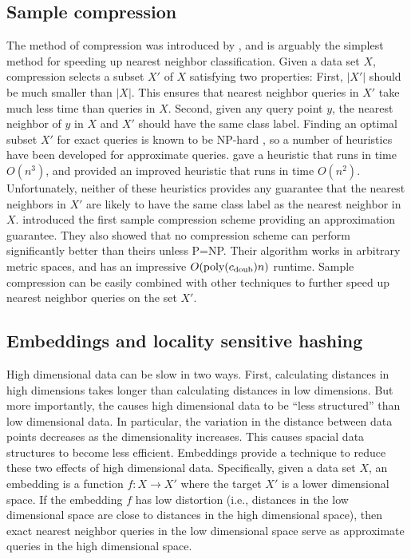 \documentclass[thesis.tex]{subfiles}
\newcommand{\cdoub}{c_\textnormal{doub}}
\newcommand{\poly}[1]{\text{poly}(#1)}
\begin{document}

\subsection{Sample compression}

The method of compression was introduced by \citet{hart1968condensed},
and is arguably the simplest method for speeding up nearest neighbor classification.
Given a data set $X$, compression selects a subset $X'$ of $X$ satisfying two properties:
First, $|X'|$ should be much smaller than $|X|$.
This ensures that nearest neighbor queries in $X'$ take much less time than queries in $X$.
Second, given any query point $y$, 
the nearest neighbor of $y$ in $X$ and $X'$ should have the same class label. 
Finding an optimal subset $X'$ for exact queries is known to be NP-hard \citep{zukhba2010np},
so a number of heuristics have been developed for approximate queries.
\citet{hart1968condensed} gave a heuristic that runs in time $O(n^3)$,
and \cite{angiulli2005fast} provided an improved heuristic that runs in time $O(n^2)$.
Unfortunately, neither of these heuristics provides any guarantee that the nearest neighbors in $X'$ are likely to have the same class label as the nearest neighbor in $X$.
\cite{gottlieb2014near} introduced the first sample compression scheme providing an approximation guarantee.
They also showed that no compression scheme can perform significantly better than theirs unless P=NP.
Their algorithm works in arbitrary metric spaces,
and has an impressive $O(\poly{\cdoub}n)$ runtime.
Sample compression can be easily combined with other techniques to further speed up nearest neighbor queries on the set $X'$.


\subsection{Embeddings and locality sensitive hashing}

High dimensional data can be slow in two ways.
First, calculating distances in high dimensions takes longer than calculating distances in low dimensions.
But more importantly, the  causes high dimensional data to be ``less structured'' than low dimensional data.
In particular, the variation in the distance between data points decreases as the dimensionality increases.
This causes spacial data structures to become less efficient.
Embeddings provide a technique to reduce these two effects of high dimensional data.
Specifically, given a data set $X$, an embedding is a function $f : X \to X'$ where the target $X'$ is a lower dimensional space.
If the embedding $f$ has low distortion 
(i.e., distances in the low dimensional space are close to distances in the high dimensional space),
then exact nearest neighbor queries in the low dimensional space serve as approximate queries in the high dimensional space.
\end{document}

